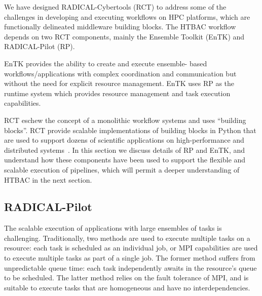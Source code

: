 
We have designed RADICAL-Cybertools (RCT) to address some of the challenges
in developing and executing workflows on HPC platforms, which are functionally 
delineated middleware building blocks. The HTBAC workflow depends on two 
RCT components, mainly the Ensemble Toolkit (EnTK) and RADICAL-Pilot (RP). 



EnTK provides the ability to create and execute ensemble-
based workflows/applications with complex coordination and communication but
without the need for explicit resource management. EnTK uses RP as the runtime
system which provides resource management and task execution capabilities. 


RCT eschew the concept of a monolithic workflow systems and uses ``building
blocks''. RCT provide scalable implementations of building blocks in Python
that are used to support dozens of scientific applications on high-performance
and distributed systems~\cite{turilli2016analysis, angius2017converging,
treikalis2016repex, balasubramanian2016ensemble, balasubramanian2016extasy}. 
In this section we discuss details of RP and EnTK, and understand how these 
components have been used to support the flexible and scalable execution of 
pipelines, which will permit a deeper understanding of HTBAC in the next 
section.




\subsection{RADICAL-Pilot}

The scalable execution of applications with large ensembles of tasks is
challenging. Traditionally, two methods are used to execute multiple tasks on
a resource: each task is scheduled as an individual job, or MPI capabilities
are used to execute multiple tasks as part of a single job. The former method
suffers from unpredictable queue time: each task independently awaits in the
resource's queue to be scheduled. The latter method relies on the fault
tolerance of MPI, and is suitable to execute tasks that are homogeneous and
have no interdependencies.

